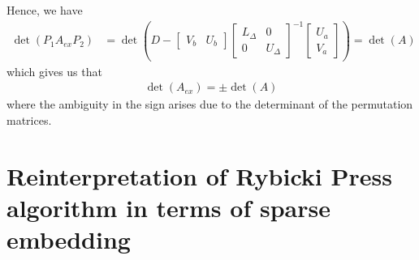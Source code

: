 \documentclass[times]{nlaauth}
\begin{document}
Hence, we have
\begin{align}
\det(P_1A_{ex}P_2) & = \det\left(D-
\begin{bmatrix}
V_b & U_b
\end{bmatrix}
\begin{bmatrix}
L_{\Delta} & 0\\
0 & U_{\Delta}
\end{bmatrix}^{-1}
\begin{bmatrix}
U_a\\
V_a
\end{bmatrix}\right) = \det(A)
\end{align}
which gives us that
\begin{align}
\det(A_{ex}) = \pm \det(A)
\end{align}
where the ambiguity in the sign arises due to the determinant of the permutation matrices.


\section{Reinterpretation of Rybicki Press algorithm in terms of sparse embedding}
\end{document}

